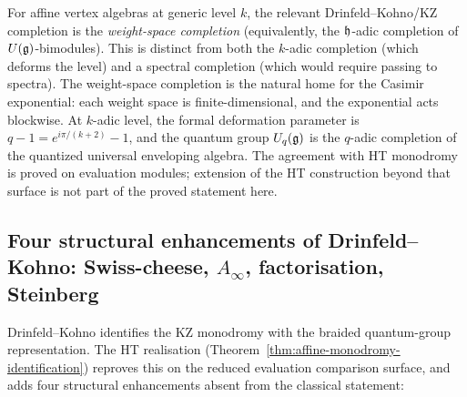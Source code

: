 \begin{remark}
\label{rem:completion-type}
For affine vertex algebras at generic level $k$, the relevant
Drinfeld--Kohno/KZ completion is the \emph{weight-space completion}
(equivalently, the $\mathfrak{h}$-adic completion of $U(\mathfrak{g})$-bimodules). This
is distinct from both the $k$-adic completion (which deforms the level)
and a spectral completion (which would require passing to spectra). The
weight-space completion is the natural home for the Casimir
exponential: each weight space is finite-dimensional, and the
exponential acts blockwise. At $k$-adic level, the formal deformation
parameter is $q - 1 = e^{i\pi/(k+2)} - 1$, and the quantum group
$U_q(\mathfrak{g})$ is the $q$-adic completion of the quantized universal
enveloping algebra. The agreement with HT monodromy is proved on
evaluation modules; extension of the HT construction beyond that
surface is not part of the proved statement here.
\end{remark}

\subsection{Four structural enhancements of Drinfeld--Kohno: Swiss-cheese, $A_\infty$, factorisation, Steinberg}
\label{subsec:beyond-dk}

Drinfeld--Kohno \cite{Dri89} identifies the KZ monodromy with the
braided quantum-group representation. The HT realisation
(Theorem~\ref{thm:affine-monodromy-identification}) reproves this on
the reduced evaluation comparison surface, and adds four structural
enhancements absent from the classical statement:

